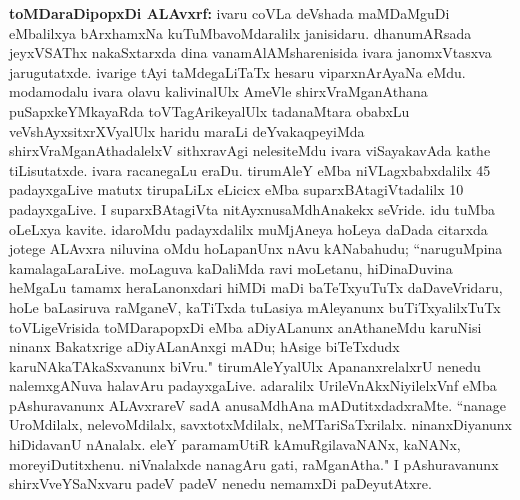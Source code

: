 {\large\textbf{toMDaraDipopxDi ALAvxrf:}} ivaru coVLa deVshada maMDaMguDi eMbalilxya bArxhamxNa kuTuMbavoMdaralilx janisidaru. dhanumARsada jeyxVSAThx nakaSxtarxda dina vanamAlAMsharenisida ivara janomxVtasxva jarugutatxde. ivarige tAyi taMdegaLiTaTx hesaru viparxnArAyaNa eMdu. modamodalu ivara olavu kalivinalUlx AmeVle shirxVraMganAthana puSapxkeYMkayaRda toVTagArikeyalUlx tadanaMtara obabxLu veVshAyxsitxrXVyalUlx haridu maraLi deYvakaqpeyiMda shirxVraMganAthadalelxV sithxravAgi nelesiteMdu ivara viSayakavAda kathe tiLisutatxde. ivara racanegaLu eraDu. tirumAleY eMba niVLagxbabxdalilx {\rm 45} padayxgaLive matutx tirupaLiLx eLicicx eMba suparxBAtagiVtadalilx {\rm 10} padayxgaLive. I suparxBAtagiVta nitAyxnusaMdhAnakekx seVride. idu tuMba oLeLxya kavite. idaroMdu padayxdalilx muMjAneya hoLeya daDada citarxda jotege ALAvxra niluvina oMdu hoLapanUnx nAvu kANabahudu; ``naruguMpina kamalagaLaraLive. moLaguva kaDaliMda ravi moLetanu, hiDinaDuvina heMgaLu tamamx heraLanonxdari hiMDi maDi baTeTxyuTuTx daDaveVridaru, hoLe baLasiruva raMganeV, kaTiTxda tuLasiya mAleyanunx buTiTxyalilxTuTx toVLigeVrisida toMDarapopxDi eMba aDiyALanunx anAthaneMdu karuNisi ninanx Bakatxrige aDiyALanAnxgi mADu; hAsige biTeTxdudx karuNAkaTAkaSxvanunx biVru." tirumAleYyalUlx ApananxrelalxrU nenedu nalemxgANuva halavAru padayxgaLive. adaralilx UrileVnAkxNiyilelxVnf eMba pAshuravanunx ALAvxrareV sadA anusaMdhAna mADutitxdadxraMte. ``nanage UroMdilalx, nelevoMdilalx, savxtotxMdilalx, neMTariSaTxrilalx. ninanxDiyanunx hiDidavanU nAnalalx. eleY paramamUtiR kAmuRgilavaNANx, kaNANx, moreyiDutitxhenu. niVnalalxde nanagAru gati, raMganAtha." I pAshuravanunx shirxVveYSaNxvaru padeV padeV nenedu nemamxDi paDeyutAtxre.

